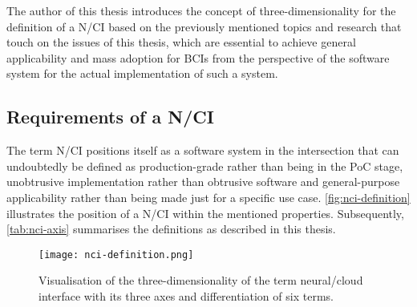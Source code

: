 The author of this thesis introduces the concept of three-dimensionality for the definition of a N/CI based on the previously mentioned topics and research that touch on the issues of this thesis, which are essential to achieve general applicability and mass adoption for BCIs from the perspective of the software system for the actual implementation of such a system.

\subsection{Requirements of a N/CI}
\label{chapter2-requirements-of-a-nci}

The term N/CI positions itself as a software system in the intersection that can undoubtedly be defined as production-grade rather than being in the PoC stage, unobtrusive implementation rather than obtrusive software and general-purpose applicability rather than being made just for a specific use case. \autoref{fig:nci-definition} illustrates the position of a N/CI within the mentioned properties. Subsequently, \autoref{tab:nci-axis} summarises the definitions as described in this thesis.

\begin{figure}[ht]
  \centering
  \texttt{[image: nci-definition.png]}
  \caption{Visualisation of the three-dimensionality of the term neural/cloud interface with its three axes and differentiation of six terms.}
  \label{fig:nci-definition}
\end{figure}


